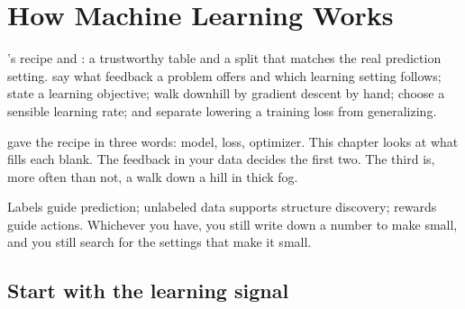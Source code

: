 \chapter{How Machine Learning Works}
\label{ch:learning}

\chapterguide%
  {'s recipe and : a trustworthy table and a split that matches the real prediction setting.}
  {say what feedback a problem offers and which learning setting follows; state a learning objective; walk downhill by gradient descent by hand; choose a sensible learning rate; and separate lowering a training loss from generalizing.}

 gave the recipe in three words: model, loss, optimizer. This chapter looks at what fills each blank. The feedback in your data decides the first two. The third is, more often than not, a walk down a hill in thick fog.

\begin{keyidea}
Labels guide prediction; unlabeled data supports structure discovery; rewards guide actions. Whichever you have, you still write down a number to make small, and you still search for the settings that make it small.
\end{keyidea}

\section{Start with the learning signal}

